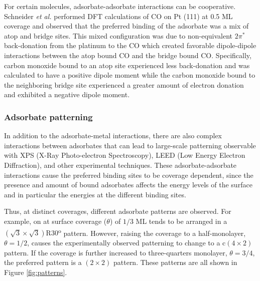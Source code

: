 For certain molecules, adsorbate-adsorbate interactions can be cooperative.
Schneider {\em et al.} performed DFT calculations of CO on Pt (111) at 0.5 ML
coverage and observed that the preferred binding of the adsorbate was a mix of
atop and bridge sites.\citep{Deshlahra:2012aa} This mixed configuration was due
to non-equivalent $2\pi^*$ back-donation from the platinum to the CO which
created favorable dipole-dipole interactions between the atop bound CO and the
bridge bound CO.  Specifically, carbon monoxide bound to an atop site
experienced less back-donation and was calculated to have a positive dipole
moment while the carbon monoxide bound to the neighboring bridge site
experienced a greater amount of electron donation and exhibited a negative
dipole moment.


\subsubsection{Adsorbate patterning}
In addition to the adsorbate-metal interactions, there are also complex
interactions between adsorbates that can lead to large-scale patterning observable
with XPS (X-Ray Photo-electron Spectroscopy), LEED (Low Energy
Electron Diffraction), and other experimental techniques. These
adsorbate-adsorbate interactions cause the preferred binding sites to be
coverage dependent, since the presence and amount of bound adsorbates
affects the energy levels of the surface and in particular the energies at the
different binding sites.

Thus, at distinct coverages, different adsorbate patterns are observed. For example,
 on  at surface coverage ($\theta$) of $1/3$ ML tends to be arranged in a
$(\sqrt{3}\times\sqrt{3})\textrm{R}30$\textsuperscript{o} pattern. However, raising the coverage
to a half-monolayer, $\theta = 1/2$, causes the experimentally observed
patterning to change to a c$(4\times2)$ pattern. If the coverage is further
increased to three-quarters monolayer, $\theta = 3/4$, the preferred pattern is
a $(2\times2)$ pattern.\citep{Guo:1989aa} These patterns are all shown in
Figure \ref{fig:patterns}.

